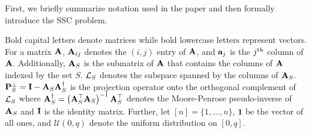 First, we briefly summarize notation used in the paper and then  formally introduce the SSC problem. 

Bold capital letters denote matrices while 
bold lowercase letters represent vectors. For a matrix ${\mathbf A}$, ${\mathbf A}_{ij}$ denotes the $(i,j)$ entry of
${\mathbf A}$, and ${\mathbf a}_j$ is the $j\textsuperscript{th}$ column of ${\mathbf A}$.
Additionally, ${\mathbf A}_S$ is the submatrix of ${\mathbf A}$ that contains the columns of ${\mathbf A}$ indexed by the set $S$. 
${\cal L}_S$ denotes the subspace spanned by the columns of ${\mathbf A}_S$. ${\mathbf P}_S^\bot={\mathbf I}-{\mathbf A}_S {\mathbf A}_S^\dagger$ is the projection operator 
onto the orthogonal complement of ${\cal L}_S$ where ${\mathbf A}_S^\dagger=\left({\mathbf A}_S^{\top}{\mathbf A}_S\right)^{-1}{\mathbf A}_S^{\top}$ 
denotes the Moore-Penrose pseudo-inverse of ${\mathbf A}_S$ and ${\mathbf I}$ is the identity matrix. Further, let $[n] = \{1,\dots,n\}$, $\mathbf{1}$ be the vector of all ones, and $\mathcal{U}(0,q)$ denote the uniform distribution on $[0,q]$.

